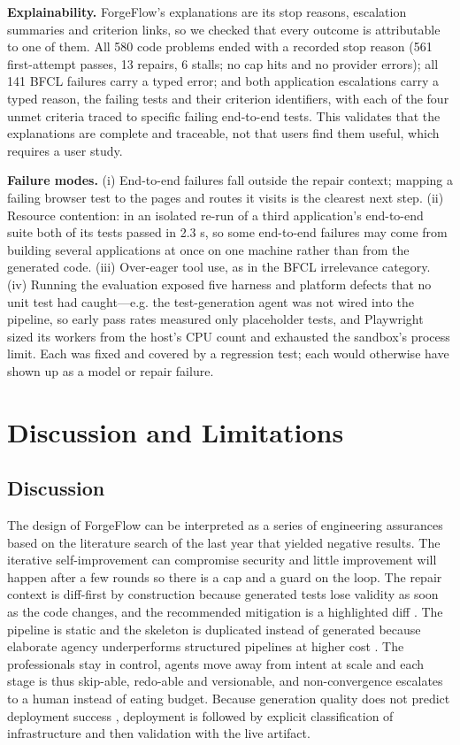 \documentclass[pdflatex,sn-mathphys-num]{sn-jnl}%
\theoremstyle{thmstyleone}%
\theoremstyle{thmstyletwo}%
\theoremstyle{thmstylethree}%
\begin{document}
\textbf{Explainability.} ForgeFlow's explanations are its stop reasons, escalation summaries and criterion links, so we checked that every outcome is attributable to one of them. All 580 code problems ended with a recorded stop reason (561 first-attempt passes, 13 repairs, 6 stalls; no cap hits and no provider errors); all 141 BFCL failures carry a typed error; and both application escalations carry a typed reason, the failing tests and their criterion identifiers, with each of the four unmet criteria traced to specific failing end-to-end tests. This validates that the explanations are complete and traceable, not that users find them useful, which requires a user study.

\textbf{Failure modes.} (i) End-to-end failures fall outside the repair context; mapping a failing browser test to the pages and routes it visits is the clearest next step. (ii) Resource contention: in an isolated re-run of a third application's end-to-end suite both of its tests passed in 2.3 s, so some end-to-end failures may come from building several applications at once on one machine rather than from the generated code. (iii) Over-eager tool use, as in the BFCL irrelevance category. (iv) Running the evaluation exposed five harness and platform defects that no unit test had caught---e.g. the test-generation agent was not wired into the pipeline, so early pass rates measured only placeholder tests, and Playwright sized its workers from the host's CPU count and exhausted the sandbox's process limit. Each was fixed and covered by a regression test; each would otherwise have shown up as a model or repair failure.

\section{Discussion and Limitations}\label{sec9}

\subsection{Discussion}\label{sec9.1}

The design of ForgeFlow can be interpreted as a series of engineering assurances based on the literature search of the last year that yielded negative results. The iterative self-improvement can compromise security \cite{r05shukla} and little improvement will happen after a few rounds \cite{r09kiecker,r10arimbur} so there is a cap and a guard on the loop. The repair context is diff-first by construction because generated tests lose validity as soon as the code changes, and the recommended mitigation is a highlighted diff \cite{r11haroon}. The pipeline is static and the skeleton is duplicated instead of generated because elaborate agency underperforms structured pipelines at higher cost \cite{r13xia}. The professionals stay in control, agents move away from intent at scale \cite{r07tang,r08huang} and each stage is thus skip-able, redo-able and versionable, and non-convergence escalates to a human instead of eating budget. Because generation quality does not predict deployment success \cite{r06zhang}, deployment is followed by explicit classification of infrastructure and then validation with the live artifact.
\end{document}
